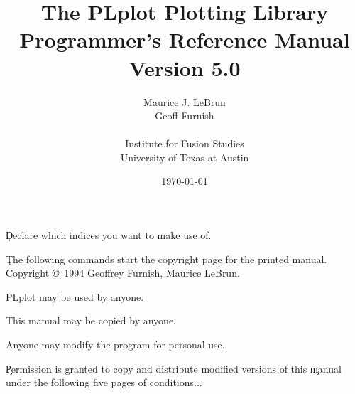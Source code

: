 %
%
%
%
%
%
%
%

\pagestyle{headings}



\c Declare which indices you want to make use of.

\title{ The PLplot Plotting Library \\ 
        Programmer's Reference Manual \\
        Version 5.0}
\author{
        Maurice J. LeBrun\\
        Geoff Furnish\\
\\
        Institute for Fusion Studies\\
        University of Texas at Austin\\
        }

\date{\today}
\maketitle

\c The following commands start the copyright page for the printed manual.
\clearpage
\vspace{0pt plus 1filll}
Copyright \copyright\ 1994 Geoffrey Furnish, Maurice LeBrun.

PLplot may be used by anyone.

This manual may be copied by anyone.

Anyone may modify the program for personal use.

\c Permission is granted to copy and distribute modified versions of this
\c manual under the following five pages of conditions...

